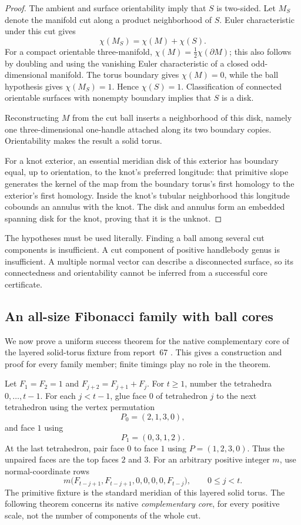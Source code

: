 \begin{proof}
The ambient and surface orientability imply that $S$ is two-sided.  Let
$M_S$ denote the manifold cut along a product neighborhood of $S$.
Euler characteristic under this cut gives
\[
 \chi(M_S)=\chi(M)+\chi(S).
\]
For a compact orientable three-manifold,
$\chi(M)=\tfrac12\chi(\partial M)$; this also follows by doubling and using
the vanishing Euler characteristic of a closed odd-dimensional manifold.
The torus boundary gives $\chi(M)=0$, while the ball hypothesis gives
$\chi(M_S)=1$.  Hence $\chi(S)=1$.  Classification of connected orientable
surfaces with nonempty boundary implies that $S$ is a disk.

Reconstructing $M$ from the cut ball inserts a neighborhood of this disk,
namely one three-dimensional one-handle attached along its two boundary
copies.  Orientability makes the result a solid torus.

For a knot exterior, an essential meridian disk of this exterior has
boundary equal, up to orientation, to the knot's preferred longitude:
that primitive slope generates the kernel of the map from the boundary
torus's first homology to the exterior's first homology.  Inside the knot's
tubular neighborhood this longitude cobounds an annulus with the knot.
The disk and annulus form an embedded spanning disk for the knot, proving
that it is the unknot.
\end{proof}

The hypotheses must be used literally.  Finding a ball among several cut
components is insufficient.  A cut component of positive handlebody genus
is insufficient.  A multiple normal vector can describe a disconnected
surface, so its connectedness and orientability cannot be inferred from a
successful core certificate.

\subsection{An all-size Fibonacci family with ball cores}
\label{geo:fibonacci}

We now prove a uniform success theorem for the native complementary core
of the layered solid-torus fixture from report~67
\cite{ProveIt2026}.  This gives a construction and proof for every family
member; finite timings play no role in the theorem.

Let $F_1=F_2=1$ and $F_{j+2}=F_{j+1}+F_j$.  For $t\ge1$, number the
tetrahedra $0,\ldots,t-1$.  For each $j<t-1$, glue face $0$ of tetrahedron
$j$ to the next tetrahedron using the vertex permutation
\[
 P_0=(2,1,3,0),
\]
and face $1$ using
\[
 P_1=(0,3,1,2).
\]
At the last tetrahedron, pair face $0$ to face $1$ using
$P=(1,2,3,0)$.  Thus the unpaired faces are the top faces $2$ and $3$.
For an arbitrary positive integer $m$, use normal-coordinate rows
\[
 m\bigl(F_{t-j+1},F_{t-j+1},0,0,0,0,F_{t-j}\bigr),
 \qquad 0\le j<t.
 \tag{G11}\label{geo:eq-fibonacci-vector}
\]
The primitive fixture is the standard meridian of this layered solid
torus.  The following theorem concerns its native \emph{complementary
core}, for every positive scale, not the number of components of the
whole cut.

